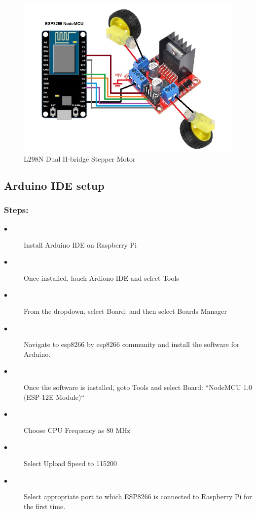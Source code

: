\documentclass[sigconf]{acmart}
\begin{document}
\begin{figure}
	\includegraphics[width=1.0\columnwidth]{images/L298N_Hbridge.jpg}
	\caption{L298N Dual H-bridge Stepper Motor}
\end{figure}

\subsection{Arduino IDE setup}
\subsubsection{Steps:}
\begin{description}
\item[$\bullet$] Install Arduino IDE on Raspberry Pi
\item[$\bullet$] Once installed, lauch Ardiono IDE and select Tools
\item[$\bullet$] From the dropdown, select Board:  and then select Boards Manager
\item[$\bullet$] Navigate to esp8266 by esp8266 community and install the software for Arduino.
\item[$\bullet$] Once the software is installed, goto Tools and select Board: ``NodeMCU 1.0 (ESP-12E Module)``
\item[$\bullet$] Choose CPU Frequency as 80 MHz
\item[$\bullet$] Select Upload Speed to 115200
\item[$\bullet$] Select appropriate port to which ESP8266 is connected to Raspberry Pi for the first time.

\end{description}
\end{document}
